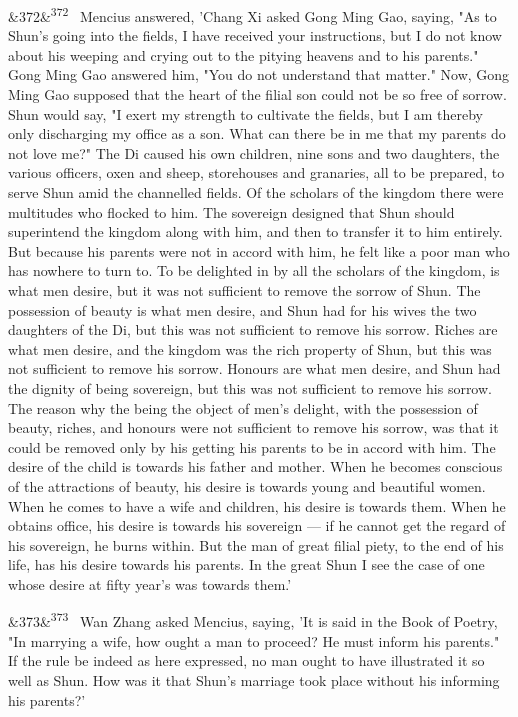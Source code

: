 \documentclass[12pt]{article}
\newcommand{\para}[1][]{\par\noindent\ifx&#1&\else\textsuperscript{\footnotesize #1}~\fi}
\begin{document}
\para[372] Mencius answered, 'Chang Xi asked Gong Ming Gao, saying, "As to Shun's going into the fields, I have received your instructions, but I do not know about his weeping and crying out to the pitying heavens and to his parents." Gong Ming Gao answered him, "You do not understand that matter." Now, Gong Ming Gao supposed that the heart of the filial son could not be so free of sorrow. Shun would say, "I exert my strength to cultivate the fields, but I am thereby only discharging my office as a son. What can there be in me that my parents do not love me?" The Di caused his own children, nine sons and two daughters, the various officers, oxen and sheep, storehouses and granaries, all to be prepared, to serve Shun amid the channelled fields. Of the scholars of the kingdom there were multitudes who flocked to him. The sovereign designed that Shun should superintend the kingdom along with him, and then to transfer it to him entirely. But because his parents were not in accord with him, he felt like a poor man who has nowhere to turn to. To be delighted in by all the scholars of the kingdom, is what men desire, but it was not sufficient to remove the sorrow of Shun. The possession of beauty is what men desire, and Shun had for his wives the two daughters of the Di, but this was not sufficient to remove his sorrow. Riches are what men desire, and the kingdom was the rich property of Shun, but this was not sufficient to remove his sorrow. Honours are what men desire, and Shun had the dignity of being sovereign, but this was not sufficient to remove his sorrow. The reason why the being the object of men's delight, with the possession of beauty, riches, and honours were not sufficient to remove his sorrow, was that it could be removed only by his getting his parents to be in accord with him. The desire of the child is towards his father and mother. When he becomes conscious of the attractions of beauty, his desire is towards young and beautiful women. When he comes to have a wife and children, his desire is towards them. When he obtains office, his desire is towards his sovereign --- if he cannot get the regard of his sovereign, he burns within. But the man of great filial piety, to the end of his life, has his desire towards his parents. In the great Shun I see the case of one whose desire at fifty year's was towards them.'

\para[373] Wan Zhang asked Mencius, saying, 'It is said in the Book of Poetry, "In marrying a wife, how ought a man to proceed? He must inform his parents." If the rule be indeed as here expressed, no man ought to have illustrated it so well as Shun. How was it that Shun's marriage took place without his informing his parents?'
\end{document}
